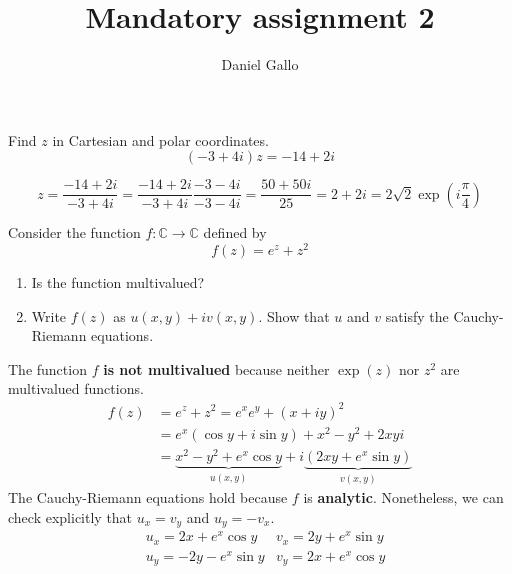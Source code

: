 \documentclass{article}
\title{Mandatory assignment 2}
\author{Daniel Gallo}
\def\C{\mathbb{C}}
\renewcommand{\exp}[1]{\operatorname{exp}\left(#1\right)}
\begin{document}
    \maketitle

    \begin{tcolorbox}[title=Exercise 1]
        Find $z$ in Cartesian and polar coordinates.
        \begin{equation*}
            (-3 + 4i) z = -14 + 2i
        \end{equation*}
    \end{tcolorbox}
    \begin{equation*}
        z = \frac{-14 + 2i}{-3 + 4i} = \frac{-14 + 2i}{-3 + 4i} \frac{-3 -4i}{-3 - 4i} = \frac{50 + 50i}{25} = 2 + 2i = 2\sqrt{2} \exp{i\frac{\pi}{4}}
    \end{equation*}
    
    \begin{tcolorbox}[title=Exercise 2]
        Consider the function $f \colon \C \to \C$ defined by
        \begin{equation*}
            f(z) = e^z + z^2
        \end{equation*}
        \begin{enumerate}[label=(\alph*)]
            \item Is the function multivalued?
            \item Write $f(z)$ as $u(x, y) + iv(x, y)$. Show that $u$ and $v$ satisfy the Cauchy-Riemann equations.
        \end{enumerate}    
    \end{tcolorbox}
    The function $f$ \textbf{is not multivalued} because neither $\exp{z}$ nor $z^2$ are multivalued functions.
    \begin{align*}
        f(z) &= e^z + z^2 = e^x e^y + (x + iy)^2 \\
        &= e^x (\cos{y} + i\sin{y}) + x^2 - y^2 + 2xyi \\
        &= \underbrace{x^2 - y^2 + e^x\cos{y}}_{u(x, y)} + i\underbrace{(2xy + e^x\sin{y})}_{v(x, y)}
    \end{align*}
    The Cauchy-Riemann equations hold because $f$ is \textbf{analytic}. Nonetheless, we can check explicitly that $u_x = v_y$ and $u_y = -v_x$.
    \begin{align*}
        &u_x = 2x + e^x\cos{y}  & v_x = 2y + e^x\sin{y} \\
        &u_y = -2y - e^x\sin{y} & v_y = 2x + e^x\cos{y}
    \end{align*}
\end{document}
